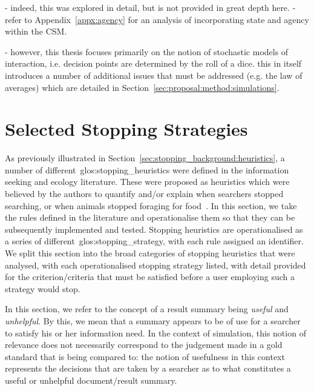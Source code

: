 - indeed, this was explored in detail, but is not provided in great depth here.
- refer to Appendix~\ref{appx:agency} for an analysis of incorporating state and agency within the CSM.

- however, this thesis focuses primarily on the notion of stochastic models of interaction, i.e. decision points are determined by the roll of a dice. this in itself introduces a number of additional issues that must be addressed (e.g. the law of averages) which are detailed in Section~\ref{sec:proposal:method:simulations}.

\section{Selected Stopping Strategies}\label{sec:proposal:strategies}
As previously illustrated in Section~\ref{sec:stopping_background:heuristics}, a number of different~\glspl{glos:stopping_heuristic} were defined in the information seeking and ecology literature. These were proposed as heuristics which were believed by the authors to quantify and/or explain when searchers stopped searching, or when animals stopped foraging for food~\cite{maxwell2015stopping_strategies}. In this section, we take the rules defined in the literature and operationalise them so that they can be subsequently implemented and tested. Stopping heuristics are operationalised as a series of different~\gls{glos:stopping_strategy}, with each rule assigned an identifier. We split this section into the  broad categories of stopping heuristics that were analysed, with each operationalised stopping strategy listed, with detail provided for the criterion/criteria that must be satisfied before a user employing such a strategy would stop. 

\noindent{} In this section, we refer to the concept of a result summary being \emph{useful} and \emph{unhelpful}. By this, we mean that a summary appears to be of use for a searcher to satisfy his or her information need. In the context of simulation, this notion of relevance does not necessarily correspond to the judgement made in a gold standard that is being compared to: the notion of usefulness in this context represents the decisions that are taken by a searcher as to what constitutes a useful or unhelpful document/result summary.

